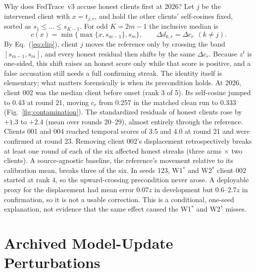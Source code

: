 \documentclass{article}
\newcommand{\vthree}{FedTrace~v3}
\newcommand{\Wone}{W1$^\ast$}
\newcommand{\Wtwo}{W2$^\ast$}
\begin{document}
Why does \vthree{} accuse honest clients first at 2026? Let $j$ be the intervened client with $x=t_{j,r}$, and hold
the other clients' self-cosines fixed, sorted as $s_1\le\dots\le s_{K-1}$. For odd $K=2m-1$ the inclusive median is
\begin{equation}
c(x)=\min\{\max\{x,s_{m-1}\},s_m\},\qquad \Delta d_{k,r}=\Delta c_r\ \ (k\neq j).
\label{eq:clip}
\end{equation}
By Eq.~(\ref{eq:clip}), client $j$ moves the reference only by crossing the band $[s_{m-1},s_m]$, and every honest residual then shifts by
the same $\Delta c_r$. Because $z^t$ is one-sided, this shift raises an honest score only while that score is
positive, and a false accusation still needs a full confirming streak. The identity itself is elementary; what
matters forensically is when its precondition holds. At 2026, client 002 was the median client before onset (rank
3 of 5). Its self-cosine jumped to 0.43 at round 21, moving $c_r$ from 0.257 in the matched clean run to 0.333
(Fig.~\ref{fig:contamination}). The standardized residuals of honest clients rose by $+1.3$ to $+2.4$ (mean over
rounds 20--29), almost entirely through the reference. Clients 001 and 004 reached temporal scores of 3.5 and 4.0 at
round 21 and were confirmed at round 23. Removing client 002's displacement retrospectively breaks at least one
round of each of the six affected honest streaks (three arms $\times$ two clients). A source-agnostic baseline, the
reference's movement relative to its calibration mean, breaks three of the six. In seeds 123, \Wone{} and \Wtwo{}
client 002 started at rank 4, so the upward-crossing precondition never arose. A deployable proxy for the
displacement had mean error 0.07$z$ in development but 0.6--2.7$z$ in confirmation, so it is not a usable
correction. This is a conditional, one-seed explanation, not evidence that the same effect caused the \Wone{} and
\Wtwo{} misses.

\section{Archived Model-Update Perturbations}
\label{sec:archived}
\end{document}
